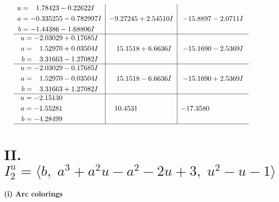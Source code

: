 \documentclass[1p]{elsarticle_modified}
\theoremstyle{definition}
\begin{document}
$$\begin{array}{c|c|c}
\begin{aligned}
u &= \phantom{-}1.78423 - 0.22622 I \\
a &= -0.335255 - 0.782997 I \\
b &= -1.44386 - 1.68806 I\end{aligned}
 & -9.27245 + 2.54510 I & -15.8897 - 2.0711 I \\ \hline\begin{aligned}
u &= -2.03029 + 0.17685 I \\
a &= \phantom{-}1.52970 + 0.03504 I \\
b &= \phantom{-}3.31663 - 1.27082 I\end{aligned}
 & \phantom{-}15.1518 + 6.6636 I & -15.1690 - 2.5369 I \\ \hline\begin{aligned}
u &= -2.03029 - 0.17685 I \\
a &= \phantom{-}1.52970 - 0.03504 I \\
b &= \phantom{-}3.31663 + 1.27082 I\end{aligned}
 & \phantom{-}15.1518 - 6.6636 I & -15.1690 + 2.5369 I \\ \hline\begin{aligned}
u &= -2.15130\phantom{ +0.000000I} \\
a &= -1.55281\phantom{ +0.000000I} \\
b &= -4.28499\phantom{ +0.000000I}\end{aligned}
 & \phantom{-}10.4531\phantom{ +0.000000I} & -17.3580\phantom{ +0.000000I}\\
 \hline 
 \end{array}$$\newpage\newpage\renewcommand{\arraystretch}{1}
\centering \section*{II. $I^u_{2}= \langle b,\;a^3+a^2 u- a^2-2 u+3,\;u^2- u-1 \rangle$}
\flushleft \textbf{(i) Arc colorings}\\
\end{document}
